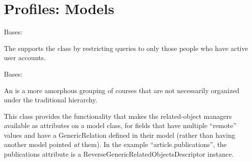 \documentclass[letterpaper,10pt,english]{sphinxmanual}
\begin{document}
\chapter{Profiles: Models}
\label{generated/apps.profiles.models:welcome-to-datamyne-s-documentation}\label{generated/apps.profiles.models:module-apps.profiles.models}\label{generated/apps.profiles.models::doc}\label{generated/apps.profiles.models:profiles-models}

\begin{fulllineitems}
\label{generated/apps.profiles.models:apps.profiles.models.ActivePersonManager}
Bases: 

The  supports the  class by restricting
queries to only those people who have active user accounts.

\end{fulllineitems}



\begin{fulllineitems}
\label{generated/apps.profiles.models:apps.profiles.models.AreaOfStudy}
Bases: {\hyperref[generated/apps.profiles.models:apps.profiles.models.BaseModel]{}}

An  is a more amorphous grouping of courses that are not
necessarily organized under the traditional hierarchy.


\begin{fulllineitems}
\label{generated/apps.profiles.models:apps.profiles.models.AreaOfStudy.unit_permissions}
This class provides the functionality that makes the related-object
managers available as attributes on a model class, for fields that have
multiple ``remote'' values and have a GenericRelation defined in their model
(rather than having another model pointed \emph{at} them). In the example
``article.publications'', the publications attribute is a
ReverseGenericRelatedObjectsDescriptor instance.

\end{fulllineitems}


\end{fulllineitems}
\end{document}
